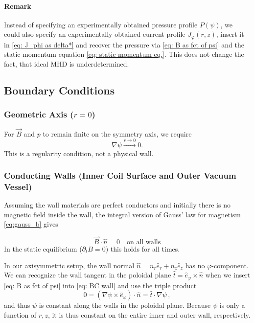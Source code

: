 \paragraph{Remark} Instead of specifying an experimentally obtained pressure profile
$P(\psi)$, we could also specify an experimentally obtained current profile $J_\varphi(r,z)$, insert it in 
\eqref{eq: J_phi as delta*} and recover the pressure via \eqref{eq: B as fct of psi}
and the static momentum equation \eqref{eq: static momentum eq.}. 
This does not change the fact, that ideal MHD is underdetermined.

\subsection{Boundary Conditions}
\label{subsec: equilibrium BC}

\subsubsection{Geometric Axis ($r = 0$)}
For $\vec{B}$ and $p$ to remain finite on the symmetry axis, we require
\begin{equation*}
    \nabla\psi \xrightarrow{r \to 0} 0.
\end{equation*}
This is a regularity condition, not a physical wall.

\subsubsection{Conducting Walls (Inner Coil Surface and Outer Vacuum Vessel)}
Assuming the wall materials are perfect conductors and initially there is no magnetic field inside the wall, 
the integral version of Gauss' law for magnetism \eqref{eq:gauss_b} gives 

\begin{equation}
    \vec{B} \cdot \hat{n} = 0 \quad \text{on all walls}
    \label{eq: BC wall}
\end{equation}
In the static equilibrium ($\partial_t B = 0$) this holds for all times.

In our axisymmetric setup, the wall normal $\hat{n} = n_r\hat{e}_r + n_z\hat{e}_z$ has no
$\varphi$-component. We can recognize the wall tangent in the poloidal plane $\hat{t} = \hat{e}_\varphi \times \hat{n}$
when we insert \eqref{eq: B as fct of psi} into \eqref{eq: BC wall}
and use the triple product
\begin{equation*}
    0 = \left(\nabla\psi \times \hat{e}_\varphi\right)\cdot\hat{n}
    = \hat{t}\cdot \nabla\psi  \, ,
\end{equation*}
and thus $\psi$ is constant along the walls in the poloidal plane.
Because $\psi$ is only a function of $r,z$, it is thus constant on the entire inner and outer wall, respectively.

